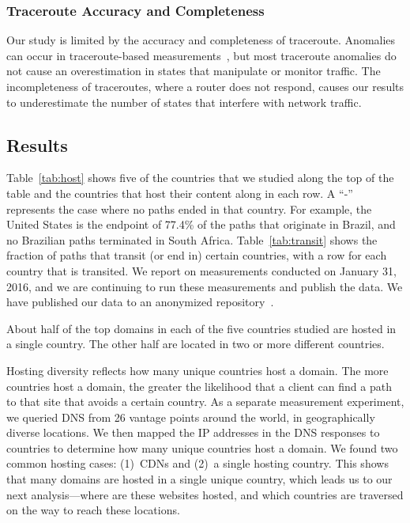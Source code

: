 \subsubsection{Traceroute Accuracy and Completeness}
Our study is limited by the accuracy and completeness of traceroute.
Anomalies can occur in traceroute-based
measurements~\cite{augustin2006avoiding}, but most traceroute anomalies
do not cause an overestimation in states that manipulate or monitor traffic.  The
incompleteness of traceroutes, where a router does not respond, causes
our results to underestimate the number of states that interfere with network 
traffic.


\subsection{Results}



Table~\ref{tab:host} shows five of the countries that we studied along the top
of the table and the countries that host their content along in each row.  A
``-'' represents the case where no paths ended in that country. For example,
the United States is the endpoint of 77.4\% of the paths that originate in
Brazil, and no Brazilian paths terminated in South Africa.
Table~\ref{tab:transit} shows the fraction of paths that transit (or end in)
certain countries, with a row for each country that is transited.  We report 
on measurements conducted on January 31, 2016, and we are continuing to run 
these measurements and publish the data.  We have published our data 
to an anonymized repository~\cite{ransom_data}.

\begin{finding} About half of the top domains in each of
the five countries studied are hosted in a single country.  The other half are
located in two or more different countries. \end{finding} 

\noindent Hosting diversity reflects how many unique
countries host a domain.  The more countries host a domain, the greater the
likelihood that a client can find a path to that site that avoids a certain
country. As a separate measurement experiment, we queried DNS from 26 vantage points around the world, in
geographically diverse locations. We then mapped the IP addresses in the DNS
responses to countries to determine how many unique countries host a domain.
We found two common hosting cases:
(1)~CDNs and (2)~a single hosting country.  This shows that many domains are
hosted in a single unique country, which leads us to our next analysis---where
are these websites hosted, and which countries are traversed on the way to
reach these locations.

